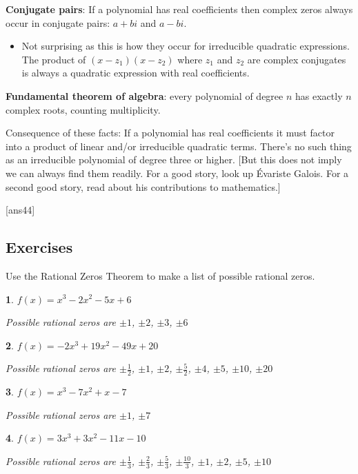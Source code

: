 \documentclass{amsbook}
\newtheorem{exc}{}
\newenvironment{ex}{\begin{exc}\normalfont}{\end{exc}}
\numberwithin{section}{chapter}
\numberwithin{equation}{chapter}
\newcommand{\qi}[1]{\begin{itemize}\item #1 \end{itemize}}
\begin{document}
\textbf{Conjugate pairs}: If a polynomial has real coefficients then complex zeros always occur in conjugate pairs: $a+bi$ and $a-bi$.
\qi{Not surprising as this is how they occur for irreducible quadratic expressions. The product of $(x-z_1)(x-z_2)$ where $z_1$ and $z_2$ are complex conjugates is always a quadratic expression with real coefficients.  }

\textbf{Fundamental theorem of algebra}: every polynomial of degree $n$ has exactly $n$ complex roots, counting multiplicity.

Consequence of these facts: If a polynomial has real coefficients it must factor into a product of linear and/or irreducible quadratic terms. There's no such thing as an irreducible polynomial of degree three or higher. [But this does not imply we can always find them readily. For a good story, look up \'{E}variste Galois. For a second good story, read about his contributions to mathematics.]

[ans44]
\subsection*{Exercises \nopunct} \hfill

	
Use the Rational Zeros Theorem to make a list of possible rational zeros.

\begin{multicols}{2}


\begin{ex}
	$f(x) = x^{3} - 2x^{2} - 5x + 6$ 
	\begin{sol}
		Possible rational zeros are $\pm 1$, $\pm 2$, $\pm 3$, $\pm 6$
	\end{sol}
\end{ex}


\begin{ex}
	 $f(x) = -2x^{3} + 19x^{2} - 49x + 20$
	\begin{sol}
		Possible rational zeros are  $\pm \frac{1}{2}$, $\pm 1$, $\pm 2$, $\pm \frac{5}{2}$, $\pm 4$, $\pm 5$, $\pm 10$, $\pm 20$ 
	\end{sol}
\end{ex}


\begin{ex}
	$f(x) = x^{3} - 7x^{2} + x - 7$
	\begin{sol}
		  Possible rational zeros are $\pm 1$, $\pm 7$
	\end{sol}
\end{ex}

\begin{ex}
	$f(x) = 3x^{3} + 3x^{2} - 11x - 10$
	\begin{sol}
	 Possible rational zeros are $\pm \frac{1}{3}$, $\pm \frac{2}{3}$, $\pm \frac{5}{3}$, $\pm \frac{10}{3}$, $\pm 1$, $\pm 2$, $\pm 5$, $\pm 10$	
	\end{sol}
\end{ex}
\end{multicols}
\end{document}
